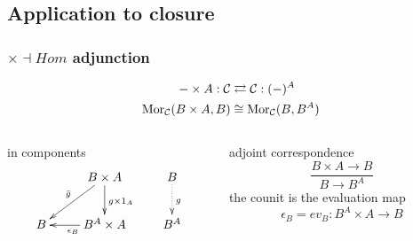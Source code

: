 \subsection{Application to closure}
\begin{frame}[t]
\frametitle{$\times \dashv Hom$ adjunction}
\begin{block}{}
\abovedisplayskip=0pt
\begin{align*}
- \times A: \mathcal{C} & \rightleftarrows \mathcal{C}: (-)^A\\
\mathop{\rm Mor}\nolimits_{\mathcal{C}}(B \times A, B) & \cong  \mathop{\rm Mor}\nolimits_{\mathcal{C}}(B, B^A)
\end{align*}
\end{block}
\begin{columns}[t]
    \begin{column}{0.5\textwidth}
\begin{block}{in components}
			$$
			\xymatrix{
			& B \times A \ar[d]^{g \times 1_A} \ar[dl]_{\bar{g}} & B \ar@{.>}[d]^{g}\\
			B & B^A \times A \ar[l]^{\epsilon_B} & B^A}
			$$
		\end{block}
    \end{column}
    \begin{column}{0.5\textwidth}
		\begin{block}{adjoint correspondence}
		\abovedisplayskip=0pt
		$$
			\frac{B \times A \longrightarrow B}{B \longrightarrow B^A}
		$$
		the counit is the evaluation map
		$$
			\epsilon_B = ev_B \colon B^A \times A \longrightarrow B
		$$
		\end{block}		
    \end{column}
\end{columns}
\end{frame}

